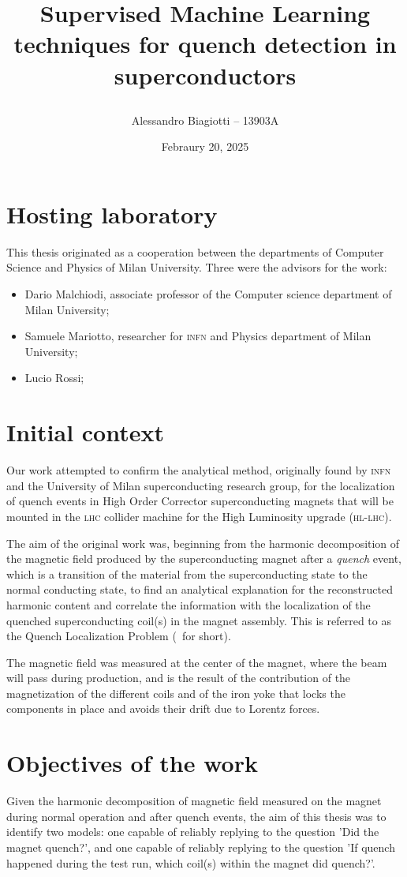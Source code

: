 \documentclass[a4paper, notitlepage]{article}
\title{
	\textsf{Supervised Machine Learning techniques for quench detection in superconductors} \\
	\author{Alessandro Biagiotti -- 13903A}
        \date{Febraury 20, 2025}
}
\begin{document}
\maketitle
\section{Hosting laboratory}
This thesis originated as a cooperation between the departments of Computer Science and Physics of
Milan University. Three were the advisors for the work:
\begin{itemize}
	\item Dario Malchiodi, associate professor of the Computer science department of Milan University;
	\item Samuele Mariotto, researcher for \textsc{infn} and Physics department of Milan
	      University;
	\item Lucio Rossi;
\end{itemize}
\section{Initial context}
Our work attempted to confirm the analytical method, originally found by \textsc{infn} and the
University of Milan superconducting research group, for the localization of quench events in High
Order Corrector superconducting magnets \cite{mariotto2022-hoc, mariotto2022-generic} that will be
mounted in the \textsc{lhc} collider machine for the High Luminosity upgrade \cite{rossi2024-hllhc}
(\textsc{hl-lhc}).

The aim of the original work was, beginning from the harmonic decomposition of the magnetic
field produced by the superconducting magnet after a \emph{quench} event, which is a transition of the
material from the superconducting state to the normal conducting state, to find an analytical
explanation for the reconstructed harmonic content and correlate the information with the
localization of the quenched superconducting coil(s) in the magnet assembly. This is
referred to as the Quench Localization Problem (\qlp\ for short).

The magnetic field was measured at the center of the magnet, where the beam will pass during
production, and is the result of the contribution of the magnetization of the different coils and of
the iron yoke that locks the components in place and avoids their drift due to Lorentz forces.

\section{Objectives of the work}
Given the harmonic decomposition of magnetic field measured on the magnet during normal operation
and after quench events, the aim of this thesis was to identify two models: one capable of reliably
replying to the question 'Did the magnet quench?', and one capable of reliably replying to the
question 'If quench happened during the test run, which coil(s) within the magnet did quench?'.
\end{document}
